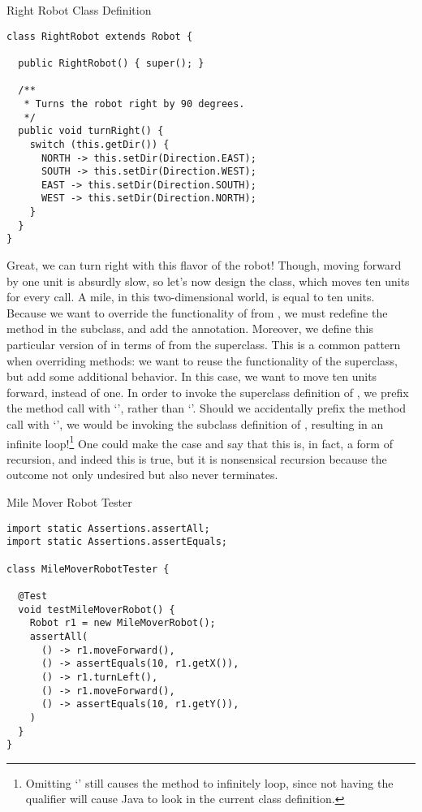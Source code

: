 \begin{cl}{Right Robot Class Definition}
\begin{lstlisting}[language=MyJava]
class RightRobot extends Robot {

  public RightRobot() { super(); }

  /**
   * Turns the robot right by 90 degrees.
   */
  public void turnRight() {
    switch (this.getDir()) {
      NORTH -> this.setDir(Direction.EAST);
      SOUTH -> this.setDir(Direction.WEST);
      EAST -> this.setDir(Direction.SOUTH);
      WEST -> this.setDir(Direction.NORTH);
    }
  }
}
\end{lstlisting}
\end{cl}

Great, we can turn right with this flavor of the robot! Though, moving forward by one unit is absurdly slow, so let's now design the  class, which moves ten units for every  call. A mile, in this two-dimensional world, is equal to ten units. Because we want to override the functionality of  from , we must redefine the method in the subclass, and add the  annotation. Moreover, we define this particular version of  in terms of  from the superclass. This is a common pattern when overriding methods: we want to reuse the functionality of the superclass, but add some additional behavior. In this case, we want to move ten units forward, instead of one. In order to invoke the superclass definition of , we prefix the method call with `', rather than `'. Should we accidentally prefix the method call with `', we would be invoking the subclass definition of , resulting in an infinite loop!\footnote{Omitting `' still causes the method to infinitely loop, since not having the qualifier will cause Java to look in the current class definition.} One could make the case and say that this is, in fact, a form of recursion, and indeed this is true, but it is nonsensical recursion because the outcome not only undesired but also never terminates.

\begin{cl}{Mile Mover Robot Tester}
\begin{lstlisting}[language=MyJava]
import static Assertions.assertAll;
import static Assertions.assertEquals;

class MileMoverRobotTester {

  @Test
  void testMileMoverRobot() {
    Robot r1 = new MileMoverRobot();
    assertAll(
      () -> r1.moveForward(),
      () -> assertEquals(10, r1.getX()),
      () -> r1.turnLeft(),
      () -> r1.moveForward(),
      () -> assertEquals(10, r1.getY()),
    )
  }
}
\end{lstlisting}
\end{cl}

